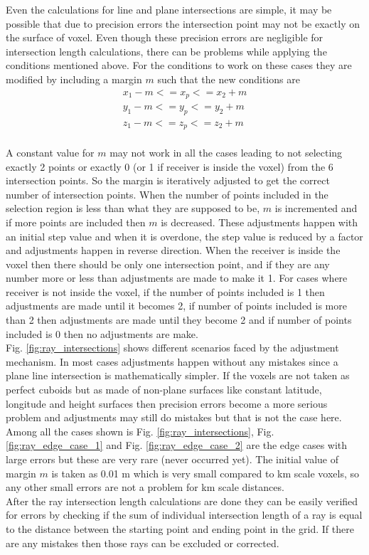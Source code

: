 \documentclass[12pt,a4paper]{article}
\begin{document}
Even the calculations for line and plane intersections are simple, it may be possible that due to precision errors the intersection point may not be exactly on the surface of voxel. Even though these precision errors are negligible for intersection length calculations, there can be problems while applying the conditions mentioned above. For the conditions to work on these cases they are modified by including a margin $m$ such that the new conditions are
\begin{equation}
	\begin{aligned}
	x_1-m <= x_p <= x_2+m \\
	y_1-m <= y_p <= y_2+m \\
	z_1-m <= z_p <= z_2+m
	\end{aligned}
\end{equation} \\	

A constant value for $m$ may not work in all the cases leading to not selecting exactly 2 points or exactly 0 (or 1 if receiver is inside the voxel) from the 6 intersection points. So the margin is iteratively adjusted to get the correct number of intersection points. When the number of points included in the selection region is less than what they are supposed to be, $m$ is incremented and if more points are included then $m$ is decreased. These adjustments happen with an initial step value and when it is overdone, the step value is reduced by a factor and adjustments happen in reverse direction. When the receiver is inside the voxel then there should be only one intersection point, and if they are any number more or less than adjustments are made to make it 1. For cases where receiver is not inside the voxel, if the number of points included is 1 then adjustments are made until it becomes 2, if number of points included is more than 2 then adjustments are made until they become 2 and if number of points included is 0 then no adjustments are make. \\

Fig. \ref{fig:ray_intersections} shows different scenarios faced by the adjustment mechanism. In most cases adjustments happen without any mistakes since a plane line intersection is mathematically simpler. If the voxels are not taken as perfect cuboids but as made of non-plane surfaces like constant latitude, longitude and height surfaces then precision errors become a more serious problem and adjustments may still do mistakes but that is not the case here. Among all the cases shown is Fig. \ref{fig:ray_intersections}, Fig. \ref{fig:ray_edge_case_1} and Fig. \ref{fig:ray_edge_case_2} are the edge cases with large errors but these are very rare (never occurred yet). The initial value of margin $m$ is taken as 0.01 m which is very small compared to km scale voxels, so any other small errors are not a problem for km scale distances. \\

After the ray intersection length calculations are done they can be easily verified for errors by checking if the sum of individual intersection length of a ray is equal to the distance between the starting point and ending point in the grid. If there are any mistakes then those rays can be excluded or corrected. \\
\end{document}
